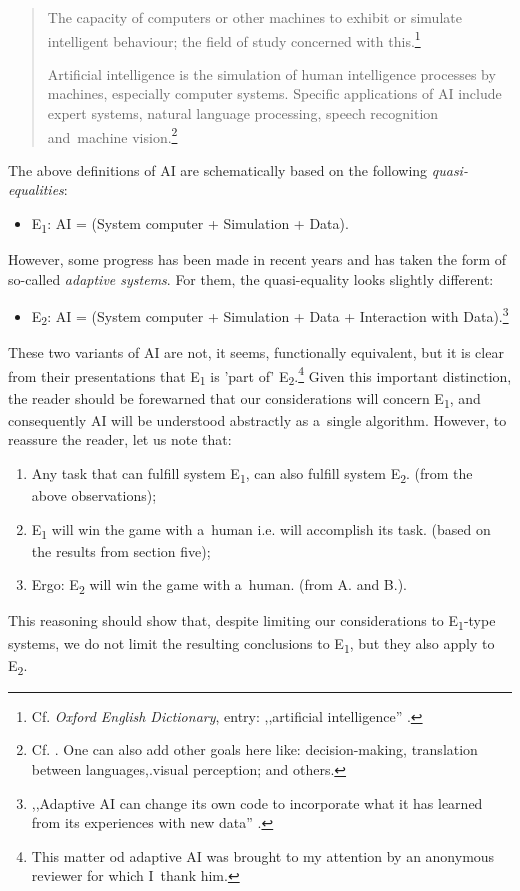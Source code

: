 \begin{quotation}
The capacity of computers or other machines to exhibit or simulate intelligent behaviour; the field of study concerned with this.\footnote{ Cf. \textit{Oxford English Dictionary}, entry: ,,artificial intelligence''
\parencite[][]{noauthor_artificial_2022}.%
}

Artificial intelligence is the simulation of human intelligence processes by machines, especially computer systems. Specific applications of AI include expert systems, natural language processing, speech recognition and~machine vision.\footnote{ Cf.
\parencite[][]{burns_what_2022}. %
 One can also add other goals here like: decision-making, translation between languages,.visual perception; and others.}

\end{quotation}
The above definitions of AI are schematically based on the following \textit{quasi-equalities}:

\begin{itemize}
\item E\textsubscript{1}: AI = (System computer + Simulation + Data).
\end{itemize}
However, some progress has been made in recent years and has taken the form of so-called \textit{adaptive systems}. For them, the quasi-equality looks slightly different:

\begin{itemize}
\item E\textsubscript{2}: AI = (System computer + Simulation + Data + Interaction with Data).\footnote{ ,,Adaptive AI can change its own code to incorporate what it has learned from its experiences with new data''
\parencite[][]{kopera_how_2021}.%
}
\end{itemize}
These two variants of AI are not, it seems, functionally equivalent, but it is clear from their presentations that E\textsubscript{1} is 'part of' E\textsubscript{2}.\footnote{ This matter od adaptive AI was brought to my attention by an anonymous reviewer for which I~thank him.} Given this important distinction, the reader should be forewarned that our considerations will concern E\textsubscript{1}, and consequently AI will be understood abstractly as a~single algorithm. However, to reassure the reader, let us note that:

\begin{enumerate}
\item Any task that can fulfill system E\textsubscript{1}, can also fulfill system E\textsubscript{2}. (from the above observations);
\item E\textsubscript{1} will win the game with a~human i.e. will accomplish its task. (based on the results from section five);
\item Ergo: E\textsubscript{2} will win the game with a~human. (from A. and B.).
\end{enumerate}
This reasoning should show that, despite limiting our considerations to E\textsubscript{1}{}-type systems, we do not limit the resulting conclusions to E\textsubscript{1}, but they also apply to E\textsubscript{2}.

